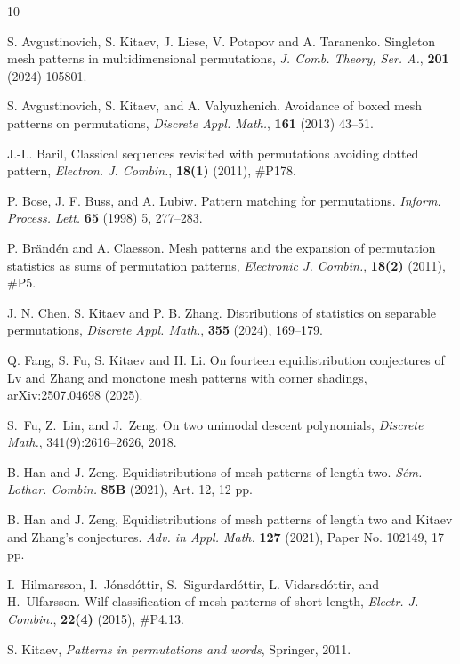 \documentclass[10pt,a4paper]{article}
\begin{document}
\begin{thebibliography}{10}


	 S. Avgustinovich, S. Kitaev, J. Liese, V. Potapov and A. Taranenko. Singleton mesh patterns in multidimensional permutations, {\em J. Comb. Theory, Ser. A.}, {\bf201} (2024) 105801.

	 S. Avgustinovich, S. Kitaev, and A. Valyuzhenich. Avoidance of boxed mesh patterns on permutations, {\em Discrete Appl. Math.}, {\bf 161} (2013) 43--51.

J.-L. Baril,  Classical sequences revisited with permutations avoiding dotted pattern,  {\em Electron. J. Combin.}, {\bf 18(1)} (2011), \#P178. 

 P. Bose, J. F. Buss, and A. Lubiw. Pattern matching for permutations. {\em Inform. Process. Lett.} {\bf 65} (1998) 5, 277--283.

 P. Br\"and\'en and A. Claesson. Mesh patterns and the expansion of permutation statistics as sums of permutation patterns, {\em Electronic J. Combin.}, {\bf 18(2)} (2011), \#P5. 

     J. N. Chen, S. Kitaev and P. B. Zhang. Distributions of statistics on separable permutations, {\em Discrete Appl. Math.}, {\bf 355} (2024), 169--179.
    
     Q. Fang, S. Fu, S. Kitaev and H. Li. On fourteen equidistribution conjectures of Lv and Zhang and monotone mesh patterns with corner shadings, arXiv:2507.04698 (2025).
    
  S.~Fu, Z.~Lin, and J.~Zeng. On two unimodal descent polynomials, {\em Discrete Math.}, 341(9):2616--2626, 2018.

 B. Han and J. Zeng. Equidistributions of mesh patterns of length two. {\em S\'{e}m. Lothar. Combin.} {\bf 85B} (2021), Art. 12, 12 pp. 

 B. Han and J. Zeng,  Equidistributions of mesh patterns of length two and Kitaev and Zhang's conjectures. {\em Adv. in Appl. Math.} {\bf 127} (2021), Paper No. 102149, 17 pp.

I.~Hilmarsson, I.~J\'onsd\'ottir, S.~Sigurdard\'ottir, L. Vidarsd\'ottir, and H.~Ulfarsson. Wilf-classification of mesh patterns of short length,
  {\em Electr. J. Combin.}, {\bf 22(4)} (2015),  \#P4.13.
	
 S. Kitaev, \emph{Patterns in permutations and words}, Springer, 2011.


\end{thebibliography}
\end{document}
